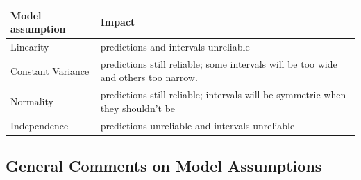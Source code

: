 \documentclass[]{book}
\begin{document}
\begin{longtable}[]{@{}ll@{}}
\toprule
\begin{minipage}[b]{0.16\columnwidth}\raggedright\strut
Model assumption\strut
\end{minipage} & \begin{minipage}[b]{0.14\columnwidth}\raggedright\strut
Impact\strut
\end{minipage}\tabularnewline
\midrule
\endhead
\begin{minipage}[t]{0.16\columnwidth}\raggedright\strut
Linearity\strut
\end{minipage} & \begin{minipage}[t]{0.14\columnwidth}\raggedright\strut
predictions and intervals unreliable\strut
\end{minipage}\tabularnewline
\begin{minipage}[t]{0.16\columnwidth}\raggedright\strut
Constant Variance\strut
\end{minipage} & \begin{minipage}[t]{0.14\columnwidth}\raggedright\strut
predictions still reliable; some intervals will be too wide and others
too narrow.\strut
\end{minipage}\tabularnewline
\begin{minipage}[t]{0.16\columnwidth}\raggedright\strut
Normality\strut
\end{minipage} & \begin{minipage}[t]{0.14\columnwidth}\raggedright\strut
predictions still reliable; intervals will be symmetric when they
shouldn't be\strut
\end{minipage}\tabularnewline
\begin{minipage}[t]{0.16\columnwidth}\raggedright\strut
Independence\strut
\end{minipage} & \begin{minipage}[t]{0.14\columnwidth}\raggedright\strut
predictions unreliable and intervals unreliable\strut
\end{minipage}\tabularnewline
\bottomrule
\end{longtable}

\subsection{General Comments on Model
Assumptions}\label{general-comments-on-model-assumptions}
\end{document}
